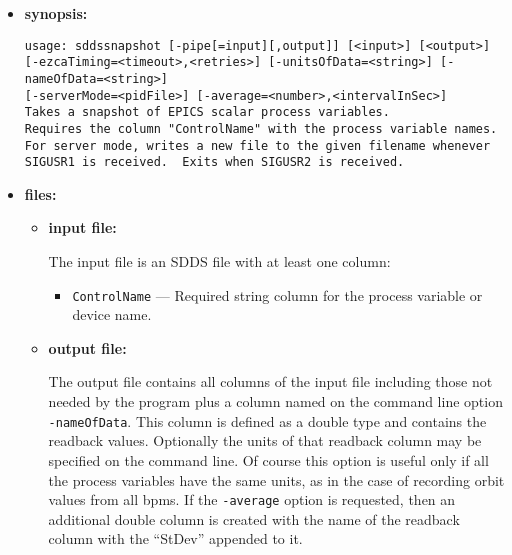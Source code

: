 \begin{itemize}
\item {\bf synopsis:} 
%
%
\begin{verbatim}
usage: sddssnapshot [-pipe[=input][,output]] [<input>] [<output>]
[-ezcaTiming=<timeout>,<retries>] [-unitsOfData=<string>] [-nameOfData=<string>]
[-serverMode=<pidFile>] [-average=<number>,<intervalInSec>]
Takes a snapshot of EPICS scalar process variables.
Requires the column "ControlName" with the process variable names.
For server mode, writes a new file to the given filename whenever
SIGUSR1 is received.  Exits when SIGUSR2 is received.
\end{verbatim}
\item {\bf files:}
\begin{itemize}
\item {\bf input file:}\par
The input file is an SDDS file with at least one column:
\begin{itemize}
        \item {\tt ControlName} --- Required string column for the process variable or device name.
\end{itemize}

\item {\bf output file:}\par
The output file contains all columns of the input file including those
not needed by the program plus a column named on the command line option {\tt -nameOfData}.
This column is defined as a double type and contains the readback values. 
Optionally the units of that readback column may be specified on the command line.
Of course this option is useful only if all the process variables have the same units, as in
the case of recording orbit values from all bpms.
If the {\tt -average} option is requested, then an additional double column is created with the name
of the readback column with the ``StDev'' appended to it.


\end{itemize}
\end{itemize}
